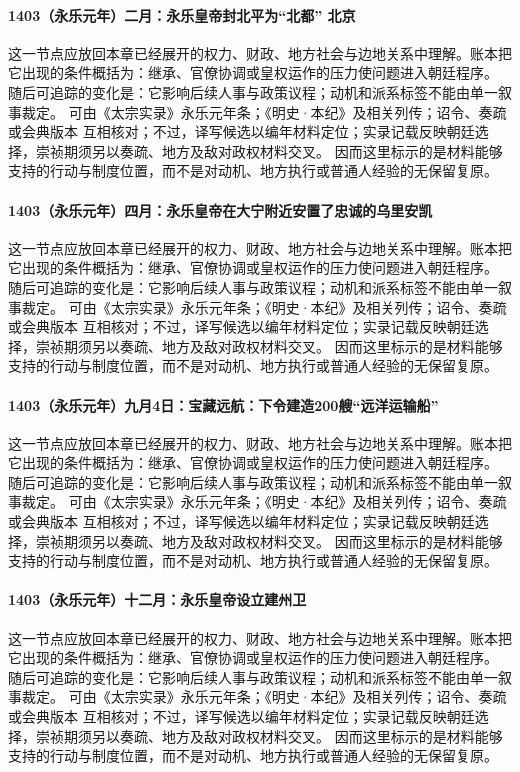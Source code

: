 \paragraph{1403（永乐元年）二月：永乐皇帝封北平为“北都” 北京} 这一节点应放回本章已经展开的权力、财政、地方社会与边地关系中理解。账本把它出现的条件概括为：继承、官僚协调或皇权运作的压力使问题进入朝廷程序。 随后可追踪的变化是：它影响后续人事与政策议程；动机和派系标签不能由单一叙事裁定。 可由《太宗实录》永乐元年条；《明史·本纪》及相关列传；诏令、奏疏或会典版本 互相核对；不过，译写候选以编年材料定位；实录记载反映朝廷选择，崇祯期须另以奏疏、地方及敌对政权材料交叉。 因而这里标示的是材料能够支持的行动与制度位置，而不是对动机、地方执行或普通人经验的无保留复原。

\paragraph{1403（永乐元年）四月：永乐皇帝在大宁附近安置了忠诚的乌里安凯} 这一节点应放回本章已经展开的权力、财政、地方社会与边地关系中理解。账本把它出现的条件概括为：继承、官僚协调或皇权运作的压力使问题进入朝廷程序。 随后可追踪的变化是：它影响后续人事与政策议程；动机和派系标签不能由单一叙事裁定。 可由《太宗实录》永乐元年条；《明史·本纪》及相关列传；诏令、奏疏或会典版本 互相核对；不过，译写候选以编年材料定位；实录记载反映朝廷选择，崇祯期须另以奏疏、地方及敌对政权材料交叉。 因而这里标示的是材料能够支持的行动与制度位置，而不是对动机、地方执行或普通人经验的无保留复原。

\paragraph{1403（永乐元年）九月4日：宝藏远航：下令建造200艘“远洋运输船”} 这一节点应放回本章已经展开的权力、财政、地方社会与边地关系中理解。账本把它出现的条件概括为：继承、官僚协调或皇权运作的压力使问题进入朝廷程序。 随后可追踪的变化是：它影响后续人事与政策议程；动机和派系标签不能由单一叙事裁定。 可由《太宗实录》永乐元年条；《明史·本纪》及相关列传；诏令、奏疏或会典版本 互相核对；不过，译写候选以编年材料定位；实录记载反映朝廷选择，崇祯期须另以奏疏、地方及敌对政权材料交叉。 因而这里标示的是材料能够支持的行动与制度位置，而不是对动机、地方执行或普通人经验的无保留复原。

\paragraph{1403（永乐元年）十二月：永乐皇帝设立建州卫} 这一节点应放回本章已经展开的权力、财政、地方社会与边地关系中理解。账本把它出现的条件概括为：继承、官僚协调或皇权运作的压力使问题进入朝廷程序。 随后可追踪的变化是：它影响后续人事与政策议程；动机和派系标签不能由单一叙事裁定。 可由《太宗实录》永乐元年条；《明史·本纪》及相关列传；诏令、奏疏或会典版本 互相核对；不过，译写候选以编年材料定位；实录记载反映朝廷选择，崇祯期须另以奏疏、地方及敌对政权材料交叉。 因而这里标示的是材料能够支持的行动与制度位置，而不是对动机、地方执行或普通人经验的无保留复原。

